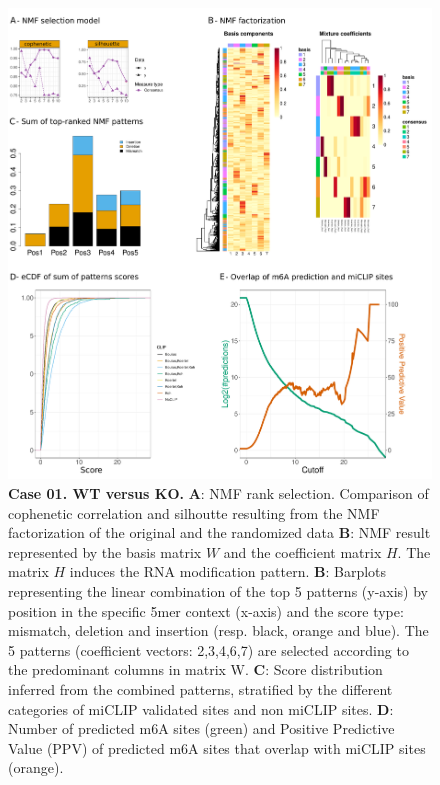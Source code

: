 \documentclass[times, 11pt, a4paper]{article}
\begin{document}
\begin{figure}[h!]
	\includegraphics[width = 1\textwidth]{img/res_wt_ko.pdf}
	\caption{\textbf{Case 01. WT  versus KO.}  \textbf{A}: NMF rank selection. Comparison of cophenetic correlation and silhoutte resulting from the NMF factorization of the original and the randomized data \textbf{B}: NMF result represented by the basis matrix $W$ and the coefficient matrix $H$. The matrix $H$ induces the RNA modification pattern. \textbf{B}: Barplots representing the linear combination of the top 5 patterns (y-axis) by position in the specific 5mer context (x-axis) and the score type: mismatch, deletion and insertion (resp. black, orange and blue). The 5 patterns (coefficient vectors: 2,3,4,6,7) are selected according to the predominant columns in matrix W.  \textbf{C}: Score distribution inferred from the combined patterns, stratified by the different categories of miCLIP validated sites and non miCLIP sites.  \textbf{D}: Number of predicted m6A sites (green) and Positive Predictive Value (PPV) of predicted m6A sites that overlap with miCLIP sites (orange). }
	\label{fig:WT_KO}
\end{figure}
\end{document}
